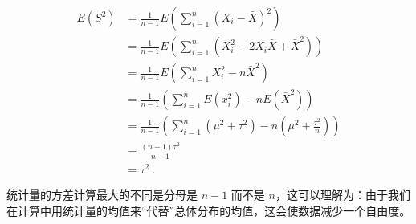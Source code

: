 \begin{equation}
\begin{aligned}
E(S^2) &= \frac {1}{n-1}E(\sum_{i=1}^n(X_i-\bar X)^2) \\
&= \frac {1}{n-1}E(\sum_{i=1}^n(X_i^2-2X_i\bar X+\bar X^2))\\
&= \frac {1}{n-1}E(\sum_{i=1}^nX_i^2-n\bar X^2)\\
&= \frac {1}{n-1} (\sum_{i=1}^nE(x_i^2)-nE(\bar X^2))\\
&= \frac {1}{n-1}(\sum_{i=1}^n(\mu^2+\tau^2)-n(\mu^2+\frac{\tau^2}{n}))\\
&= \frac {(n-1)\tau^2}{n-1}\\
&= \tau^2~.
\end{aligned}
\end{equation}

统计量的方差计算最大的不同是分母是 $n-1$ 而不是 $n$，这可以理解为：由于我们在计算中用统计量的均值来“代替”总体分布的均值，这会使数据减少一个自由度。

